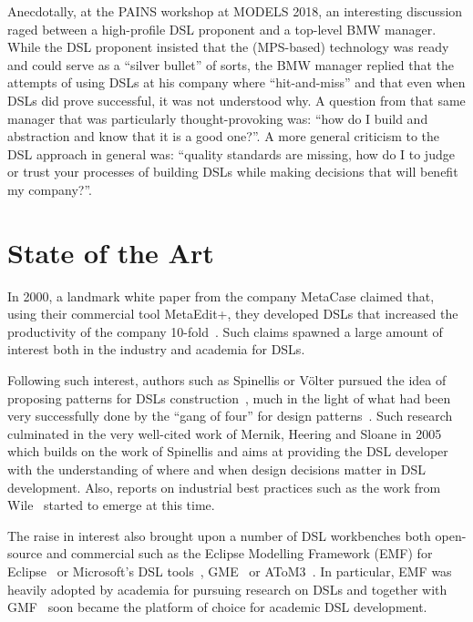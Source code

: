 \documentclass{scrartcl}
\begin{document}
Anecdotally, at the PAINS workshop at MODELS 2018, an interesting discussion
raged between a high-profile DSL proponent and a top-level BMW manager. While
the DSL proponent insisted that the (MPS-based) technology was ready and could
serve as a ``silver bullet'' of sorts, the BMW manager replied that the attempts of using
DSLs at his company where ``hit-and-miss'' and that even when DSLs did prove
successful, it was not understood why. A question from that same manager that
was particularly thought-provoking was: ``how do I build and abstraction and
know that it is a good one?''. A more general criticism to the DSL approach in
general was: ``quality standards are missing, how do I to judge or trust your
processes of building DSLs while making decisions that will benefit my company?''.
 
\section{State of the Art}
\label{sec:soa}

In 2000, a landmark white paper from the company MetaCase
claimed that, using their commercial tool MetaEdit+, they developed DSLs that 
increased the productivity of the company 10-fold~\cite{metacase00}. Such claims
spawned a large amount of interest both in the industry and academia for DSLs.

Following such interest, authors such as Spinellis or V\"olter pursued the idea
of proposing patterns for DSLs construction~\cite{Spinellis01,VolterB04}, much
in the light of what had been very successfully done by the ``gang of four'' for
design patterns~\cite{Gamma:95}. Such research culminated in the very well-cited
work of Mernik, Heering and Sloane in 2005~\cite{MernikHS05} which builds on
the work of Spinellis and aims at providing the DSL developer with the
understanding of where and when design decisions matter in DSL development.
Also, reports on industrial best practices such as the work from
Wile~\cite{Wile03} started to emerge at this time.

The raise in interest also brought upon a number of DSL workbenches both
open-source and commercial such as the Eclipse Modelling Framework
(EMF) for Eclipse~\cite{emf} or Microsoft's DSL tools~\cite{microsoftDSLTools},
GME~\cite{gme} or AToM3~\cite{atom3}. In particular, EMF was heavily adopted by
academia for pursuing research on DSLs and together with GMF~\cite{gmf} soon
became the platform of choice for academic DSL development.
 
\end{document}
